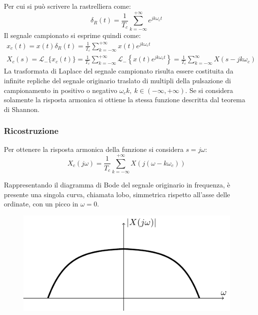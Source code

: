 \documentclass{article}
\numberwithin{equation}{subsection}
\begin{document}
Per cui si può scrivere la rastrelliera come:
\begin{equation*}
    \delta_R(t)=\displaystyle\frac{1}{T_c}\sum_{k=-\infty}^{+\infty}e^{jk\omega_ct}
\end{equation*}
Il segnale campionato si esprime quindi come:
\begin{gather}
    x_c(t)=x(t)\delta_R(t)=\displaystyle\frac{1}{T_c}\sum_{k=-\infty}^{+\infty}x(t)e^{jk\omega_ct}\\
    X_c(s)=\mathcal{L}_-\{x_c(t)\}=\displaystyle\frac{1}{T_c}\sum_{k=-\infty}^{+\infty}\mathcal{L}_-\left\{x(t)e^{jk\omega_ct}\right\}=\frac{1}{T_c}\sum_{k=-\infty}^{\infty}X(s-jk\omega_c)
\end{gather}
La trasformata di Laplace del segnale campionato risulta essere costituita da infinite repliche del segnale originario traslato di multipli della pulsazione di campionamento 
in positivo o negativo $\omega_ck,\:k\in(-\infty,+\infty)$. Se si considera solamente la risposta armonica si ottiene la stessa funzione descritta dal teorema di Shannon. 

\subsubsection{Ricostruzione}

Per ottenere la risposta armonica della funzione si considera $s=j\omega$:
\begin{equation}
    X_c(j\omega)=\displaystyle\frac{1}{T_c}\sum_{k=-\infty}^{+\infty}X(j(\omega-k\omega_c))
\end{equation}

Rappresentando il diagramma di Bode del segnale originario in frequenza, è presente una singola curva, chiamata lobo, simmetrica rispetto all'asse 
delle ordinate, con un picco in $\omega=0$.  
\begin{figure}[H]%
    \centering
    \includegraphics{replica.pdf}%
\end{figure}
\end{document}
